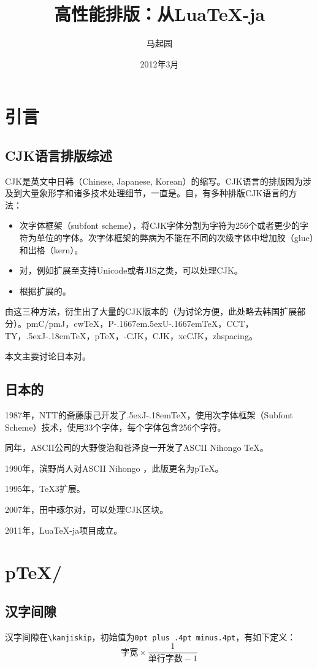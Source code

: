 \documentclass{zh-article}
\def\JTeX{\leavevmode\hbox{\lower.5ex\hbox{J}\kern-.18em\TeX}}
\def\pTeX{p\TeX}
\def\upTeX{up\TeX}
\def\LuaTeX{Lua\TeX}
\def\cwTeX{cw\TeX}
\def\PuTeX{P\kern-.1667em\lower.5ex\hbox{U}\kern-.1667em\TeX}
\begin{document}
\title{高性能排版：从\LuaTeX-ja}
\author{马起园}
\date{2012年3月}
\maketitle
\section{引言}
\subsection{CJK语言排版综述}
CJK是英文中日韩（Chinese, Japanese, Korean）的缩写。CJK语言的排版因为涉及到大量象形字和诸多技术处理细节，一直是。自，有多种排版CJK语言的方法：
\begin{itemize}
\item 次字体框架（subfont scheme），将CJK字体分割为字符为256个或者更少的字符为单位的字体。次字体框架的弊病为不能在不同的次级字体中增加胶（glue）和出格（kern）。
\item 对，例如扩展至支持Unicode或者JIS之类，可以处理CJK。
\item 根据扩展的。
\end{itemize}

由这三种方法，衍生出了大量的CJK版本的（为讨论方便，此处略去韩国扩展部分）。pmC/pmJ，\cwTeX，\PuTeX，CCT，TY，\JTeX，\pTeX，\Omega-CJK，CJK，xeCJK，zhspacing。

本文主要讨论日本对。
\subsection{日本的}
1987年，NTT的斋藤康己开发了\JTeX\cite{1}，使用次字体框架（Subfont Scheme）技术，使用33个字体，每个字体包含256个字符。

同年，ASCII公司的大野俊治和苍泽良一开发了ASCII Nihongo \TeX。

1990年，滨野尚人对ASCII Nihongo ，此版更名为\pTeX。

1995年，\TeX3扩展。

2007年，田中琢尔对，可以处理CJK区块。

2011年，LuaTeX-ja项目成立。
\section{\pTeX/}
\subsection{汉字间隙}
汉字间隙在\verb!\kanjiskip!，初始值为\verb!0pt plus .4pt minus.4pt!，有如下定义：
$$	字宽 \times \frac{1}{单行字数 - 1}	$$
\end{document}
